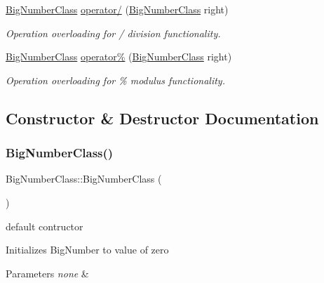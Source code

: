 \begin{DoxyCompactItemize}
\mbox{\hyperlink{class_big_numbers_namespace_1_1_big_number_class}{Big\+Number\+Class}} \mbox{\hyperlink{class_big_numbers_namespace_1_1_big_number_class_a47624997c4ce429d71a0acb8a9da822f}{operator/}} (\mbox{\hyperlink{class_big_numbers_namespace_1_1_big_number_class}{Big\+Number\+Class}} right)
\begin{DoxyCompactList}\small\item\em Operation overloading for / division functionality. \end{DoxyCompactList}\item 
\mbox{\hyperlink{class_big_numbers_namespace_1_1_big_number_class}{Big\+Number\+Class}} \mbox{\hyperlink{class_big_numbers_namespace_1_1_big_number_class_a289b2ab10871c5d9cd074d86e7505723}{operator\%}} (\mbox{\hyperlink{class_big_numbers_namespace_1_1_big_number_class}{Big\+Number\+Class}} right)
\begin{DoxyCompactList}\small\item\em Operation overloading for \% modulus functionality. \end{DoxyCompactList}\end{DoxyCompactItemize}


\subsection{Constructor \& Destructor Documentation}
\mbox{\label{class_big_numbers_namespace_1_1_big_number_class_ac8f36551cb74f6164964a761f552f8ad}} 
\subsubsection{\texorpdfstring{Big\+Number\+Class()}{BigNumberClass()}\hspace{0.1cm}{\footnotesize\ttfamily [1/2]}}
{\footnotesize\ttfamily Big\+Number\+Class\+::\+Big\+Number\+Class (\begin{DoxyParamCaption}{ }\end{DoxyParamCaption})}



default contructor 

Initializes Big\+Number to value of zero 
\begin{DoxyParams}{Parameters}
{\em none} & \\
\hline
\end{DoxyParams}
\mbox{\label{class_big_numbers_namespace_1_1_big_number_class_a12f6b5475ccbb653a84908ebc1bd1ed2}} 
